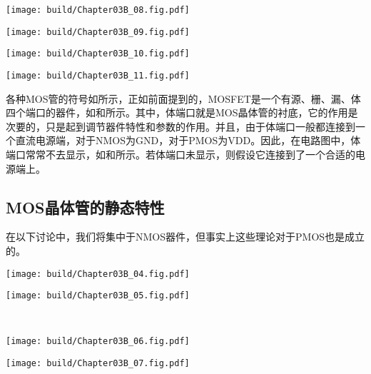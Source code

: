 \begin{Figure}[MOS晶体管的符号]
    \begin{FigureSub}[四端NMOS]
        \hspace{0.5cm}
        \texttt{[image: build/Chapter03B\_08.fig.pdf]}
        \hspace{0.5cm}
    \end{FigureSub}
    \begin{FigureSub}[四端PMOS]
        \hspace{0.5cm}
        \texttt{[image: build/Chapter03B\_09.fig.pdf]}
        \hspace{0.5cm}
    \end{FigureSub}
    \begin{FigureSub}[三端NMOS]
        \hspace{0.5cm}
        \texttt{[image: build/Chapter03B\_10.fig.pdf]}
        \hspace{0.5cm}
    \end{FigureSub}
    \begin{FigureSub}[三端PMOS]
        \hspace{0.5cm}
        \texttt{[image: build/Chapter03B\_11.fig.pdf]}
        \hspace{0.5cm}
    \end{FigureSub}
\end{Figure}

各种MOS管的符号如所示，正如前面提到的，MOSFET是一个有源、栅、漏、体四个端口的器件，如和所示。其中，体端口就是MOS晶体管的衬底，它的作用是次要的，只是起到调节器件特性和参数的作用。并且，由于体端口一般都连接到一个直流电源端，对于NMOS为GND，对于PMOS为VDD。因此，在电路图中，体端口常常不去显示，如和所示。若体端口未显示，则假设它连接到了一个合适的电源端上。

\subsection{MOS晶体管的静态特性}
在以下讨论中，我们将集中于NMOS器件，但事实上这些理论对于PMOS也是成立的。

\begin{Figure}[MOS管的工作状态]
    \begin{FigureSub}[初始状态]
        \texttt{[image: build/Chapter03B\_04.fig.pdf]}
    \end{FigureSub}
    \hspace{0.9cm}
    \begin{FigureSub}[栅耗尽层]
        \texttt{[image: build/Chapter03B\_05.fig.pdf]}
    \end{FigureSub}\\ \vspace{0.8cm}
    \begin{FigureSub}[沟道形成]
        \texttt{[image: build/Chapter03B\_06.fig.pdf]}
    \end{FigureSub}
    \hspace{0.9cm}
    \begin{FigureSub}[沟道夹断]
        \texttt{[image: build/Chapter03B\_07.fig.pdf]}
    \end{FigureSub}
\end{Figure}

